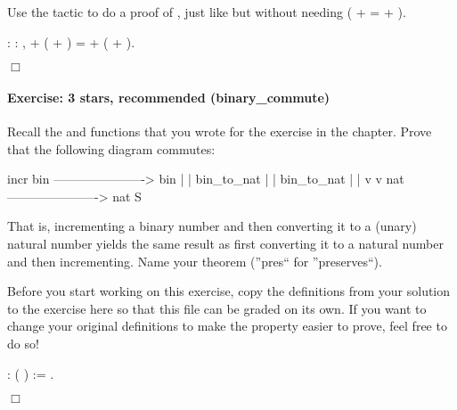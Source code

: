 \documentclass[12pt]{report}
\begin{document}
   Use the  tactic to do a proof of , just like
    but without needing  ( +  =  + ). \begin{coqdoccode}
\coqdocemptyline
\coqdocnoindent
{}  : \coqdockw{\ensuremath{\forall}}    : ,\coqdoceol
\coqdocindent{1.00em}
 + ( + ) =  + ( + ).\coqdoceol
 \end{coqdoccode}
\ensuremath{\Box} 

\paragraph{Exercise: 3 stars, recommended (binary\_commute)}

 Recall the  and  functions that you
    wrote for the  exercise in the  chapter.  Prove
    that the following diagram commutes:


                            incr
              bin ----------------------> bin
               |                           |
    bin\_to\_nat |                           |  bin\_to\_nat
               |                           |
               v                           v
              nat ----------------------> nat
                             S


    That is, incrementing a binary number and then converting it to
    a (unary) natural number yields the same result as first converting
    it to a natural number and then incrementing.
    Name your theorem  (''pres`` for ''preserves``).


    Before you start working on this exercise, copy the definitions
    from your solution to the  exercise here so that this file
    can be graded on its own.  If you want to change your original
    definitions to make the property easier to prove, feel free to
    do so! \begin{coqdoccode}
\coqdocemptyline
\coqdocemptyline
\coqdocnoindent
{}  :  (  ) := .\coqdoceol
\end{coqdoccode}
\ensuremath{\Box} 
\end{document}
